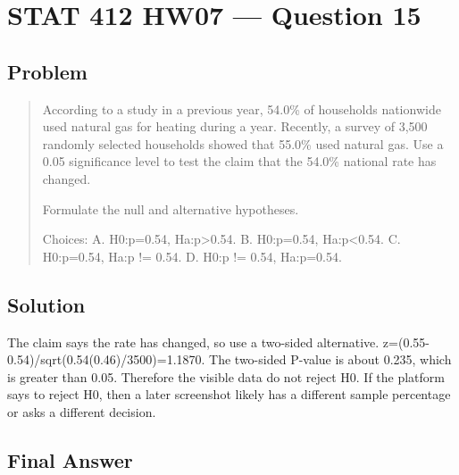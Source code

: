 \documentclass[11pt]{article}
\begin{document}
\section*{STAT 412 HW07 --- Question 15}

\subsection*{Problem}

\begin{quote}
According to a study in a previous year, 54.0\% of households nationwide used natural gas for heating during a year. Recently, a survey of 3,500 randomly selected households showed that 55.0\% used natural gas. Use a 0.05 significance level to test the claim that the 54.0\% national rate has changed.

Formulate the null and alternative hypotheses.

Choices: A. H0:p=0.54, Ha:p>0.54. B. H0:p=0.54, Ha:p<0.54. C. H0:p=0.54, Ha:p != 0.54. D. H0:p != 0.54, Ha:p=0.54.
\end{quote}

\subsection*{Solution}

The claim says the rate has changed, so use a two-sided alternative. z=(0.55-0.54)/sqrt(0.54(0.46)/3500)=1.1870. The two-sided P-value is about 0.235, which is greater than 0.05. Therefore the visible data do not reject H0. If the platform says to reject H0, then a later screenshot likely has a different sample percentage or asks a different decision.

\subsection*{Final Answer}

\end{document}
